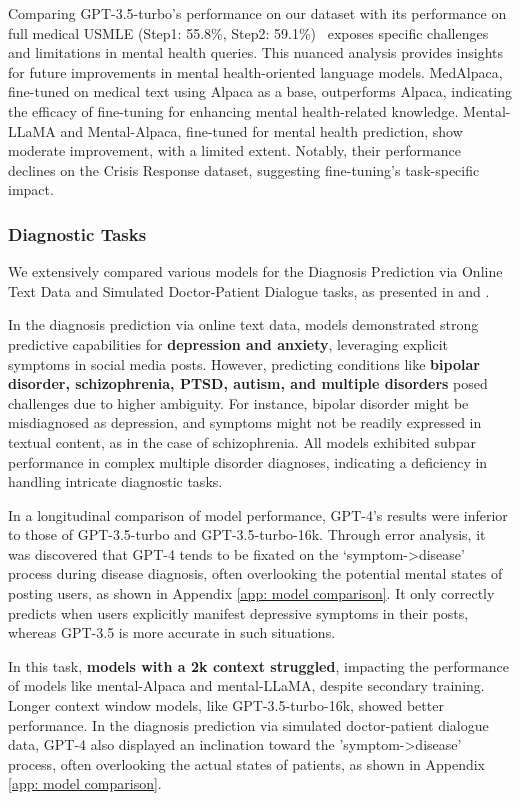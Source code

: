 Comparing GPT-3.5-turbo's performance on our dataset with its performance on full medical USMLE (Step1: 55.8\%, Step2: 59.1\%)~\cite{kung2023performance} exposes specific challenges and limitations in mental health queries. This nuanced analysis provides insights for future improvements in mental health-oriented language models.
MedAlpaca, fine-tuned on medical text using Alpaca as a base, outperforms Alpaca, indicating the efficacy of fine-tuning for enhancing mental health-related knowledge. Mental-LLaMA and Mental-Alpaca, fine-tuned for mental health prediction, show moderate improvement, with a limited extent. Notably, their performance declines on the Crisis Response dataset, suggesting fine-tuning's task-specific impact.



\subsubsection{Diagnostic Tasks} We extensively compared various models for the Diagnosis Prediction via Online Text Data and Simulated Doctor-Patient Dialogue tasks, as presented in and .%

In the diagnosis prediction via online text data, models demonstrated strong predictive capabilities for \textbf{depression and anxiety}, leveraging explicit symptoms in social media posts. However, predicting conditions like \textbf{bipolar disorder, schizophrenia, PTSD, autism, and multiple disorders} posed challenges due to higher ambiguity. For instance, bipolar disorder might be misdiagnosed as depression, and symptoms might not be readily expressed in textual content, as in the case of schizophrenia. All models exhibited subpar performance in complex multiple disorder diagnoses, indicating a deficiency in handling intricate diagnostic tasks.

In a longitudinal comparison of model performance, GPT-4's results were inferior to those of GPT-3.5-turbo and GPT-3.5-turbo-16k. Through error analysis, it was discovered that GPT-4 tends to be fixated on the `symptom->disease' process during disease diagnosis, often overlooking the potential mental states of posting users, as shown in Appendix \ref{app: model comparison}. It only correctly predicts when users explicitly manifest depressive symptoms in their posts, whereas GPT-3.5 is more accurate in such situations.

In this task, \textbf{models with a 2k context struggled}, impacting the performance of models like mental-Alpaca and mental-LLaMA, despite secondary training. Longer context window models, like GPT-3.5-turbo-16k, showed better performance.
In the diagnosis prediction via simulated doctor-patient dialogue data, GPT-4 also displayed an inclination toward the 'symptom->disease' process, often overlooking the actual states of patients, as shown in Appendix \ref{app: model comparison}.

